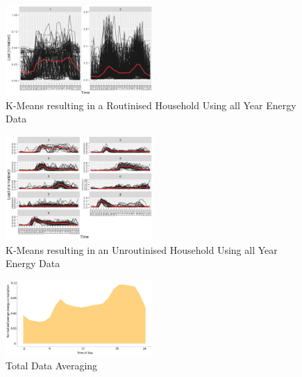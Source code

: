 \begin{figure}
    \centering
    \includegraphics[width=0.5\textwidth]{figures/malatesta_hsop/malatesta_routinisedHousehold.jpg}
    \caption{K-Means resulting in a Routinised Household Using all Year Energy Data \cite{MAL-HBP}}
    \label{fig:routinized_household}
\end{figure}

\begin{figure}
    \centering
    \includegraphics[width=0.5\textwidth]{figures/malatesta_hsop/malatesta_unroutinisedHousehold.jpg}
    \caption{K-Means resulting in an Unroutinised Household Using all Year Energy Data \cite{MAL-HBP}}
    \label{fig:non_routinized_household}
\end{figure}

\begin{figure}
    \centering
    \includegraphics[width=0.5\textwidth]{figures/malatesta_hsop/malatesta_totalDataAveraging.jpg}
    \caption{Total Data Averaging \cite{MAL-HBP}}
    \label{fig:total_data_averaging}
\end{figure}

